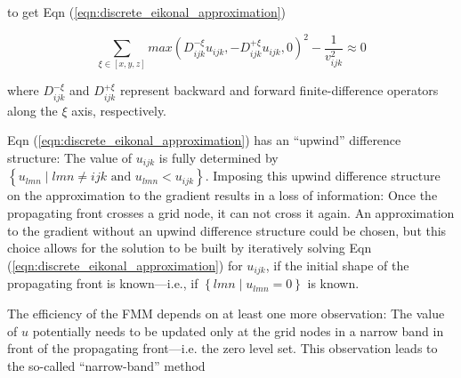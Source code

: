 	\noindent to get Eqn (\ref{eqn:discrete_eikonal_approximation})
	
	\begin{equation}
		\label{eqn:discrete_eikonal_approximation}
		\sum_{\xi \in \left[x, y, z\right]} max\left(D^{-\xi}_{ijk}u_{ijk}, -D^{+\xi}_{ijk}u_{ijk}, 0 \right)^2 - \frac{1}{v^2_{ijk}} \approx 0
	\end{equation}
	
	\noindent where $D^{-\xi}_{ijk}$ and $D^{+\xi}_{ijk}$ represent backward and forward finite-difference operators along the $\xi$ axis, respectively. 
	\par

	Eqn (\ref{eqn:discrete_eikonal_approximation}) has an ``upwind'' difference structure: The value of $u_{ijk}$ is fully determined by $\left\{u_{lmn} \mid lmn \ne ijk \text{ and } u_{lmn} < u_{ijk}\right\}$. Imposing this upwind difference structure on the approximation to the gradient results in a loss of information: Once the propagating front crosses a grid node, it can not cross it again. An approximation to the gradient without an upwind difference structure could be chosen, but this choice allows for the solution to be built by iteratively solving Eqn (\ref{eqn:discrete_eikonal_approximation}) for $u_{ijk}$, if the initial shape of the propagating front is known---i.e., if $\left\{lmn \mid u_{lmn} = 0\right\}$ is known.
	\par
	
	The efficiency of the FMM depends on at least one more observation: The value of $u$ potentially needs to be updated only at the grid nodes in a narrow band in front of the propagating front---i.e. the zero level set. This observation leads to the so-called ``narrow-band'' method
	
	
	